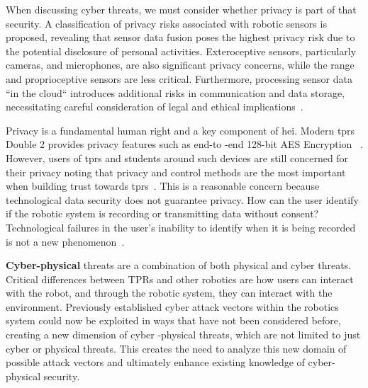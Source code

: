 When discussing cyber threats, we must consider whether privacy is part of that security. A classification of privacy risks
associated with robotic sensors is proposed, revealing that sensor data fusion poses the highest privacy risk due to the potential
disclosure of personal activities. Exteroceptive sensors, particularly cameras, and microphones, are also significant privacy concerns,
while the range and proprioceptive sensors are less critical. Furthermore, processing sensor data ``in the cloud`` introduces
additional risks in communication and data storage, necessitating careful consideration of legal and ethical implications~\cite[82-84]{cyber_sec_robotics_privacy_safety_2017}.

Privacy is a fundamental human right and a key component of \ac{hei}. Modern \ac{tprs} Double 2 provides privacy features such as end-to
-end 128-bit AES Encryption
~\cite[544]{telepresence_robots_in_classroom_2019}. However, users of \ac{tprs} and students around such devices are still concerned for
their privacy noting that privacy and control methods are the
most important when building trust towards \ac{tprs}~\cite[59]{telepresence_perspective_psychology_educational_2022}.
This is a reasonable concern because technological data security does not guarantee privacy. How can the user identify if the robotic
system is recording or transmitting data without consent? Technological failures in the user's inability to identify when it is being recorded is not a new phenomenon~\cite[]{is_my_phone_listening_2019}.

\textbf{Cyber-physical} threats are a combination of both physical and cyber threats.
Critical differences between TPRs and other robotics are how users can interact with the robot, and through the robotic system,
they can interact with the environment. Previously established cyber attack
vectors within the robotics system could now be exploited in ways that have not been considered before, creating a new dimension of cyber
-physical threats, which are not limited to just cyber or physical threats. This creates the need to analyze this new domain of
possible attack vectors and ultimately enhance existing knowledge of cyber-physical security.

